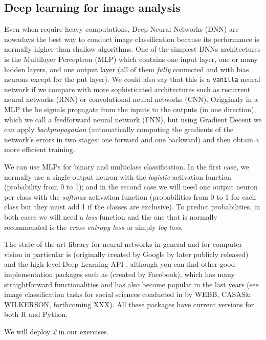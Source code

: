 \subsection{Deep learning for image analysis}
\label{subsec:deep}

Even when require heavy computations, Deep Neural Networks (DNN) are nowadays the best way to conduct image classification because its performance is normally higher than shallow algorithms. One of the simplest DNNs architectures is the Multilayer Perceptron (MLP) which contains one input layer, one or many hidden layers, and one output layer (all of them \textit{fully} connected and with bias neurons except for the put layer). We could also say that this is a \texttt{vanilla} neural network if we compare with more sophisticated architectures such as recurrent neural networks (RNN) or convolutional neural networks (CNN). Origginaly in a MLP the he signals propagate from the inputs to the outputs (in one direction), which we call a feedforward neural network (FNN), but using Gradient Decent we can apply \textit{backpropagation} (automatically computing the gradients of the network's errors in two stages: one forward and one backward) and then obtain a more efficient training.

We can use MLPs for binary and multiclass classification. In the first case, we normally use a single output neuron with the \textit{logistic} activation function (probability from 0 to 1); and in the second case we will need one output neuron per class with the \textit{softmax} activation function (probabilities from 0 to 1 for each class but they must add 1 if the classes are exclusive). To predict probabilities, in both cases we will need a \textit{loss} function and the one that is normally recommended is the \textit{cross entropy loss} or simply \textit{log loss}.

The state-of-the-art library for neural networks in general and for computer vision in particular is  (originally created by Google by later publicly released) and the high-level Deep Learning API , although you can find other good implementation packages such as  (created by Facebook), which has many straightforward functionalities and has also become popular in the last years (see image classification tasks for social sciences conducted in  by WEBB, CASAS\& WILKERSON, forthcoming XXX). All these packages have current versions for both R and Python. 

We will deploy  \textit{2} in our exercises. 





